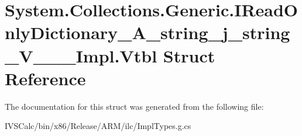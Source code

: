\hypertarget{struct_system_1_1_collections_1_1_generic_1_1_i_read_only_dictionary___a__string__j__string___v_______impl_1_1_vtbl}{}\section{System.\+Collections.\+Generic.\+I\+Read\+Only\+Dictionary\+\_\+\+A\+\_\+string\+\_\+j\+\_\+string\+\_\+\+V\+\_\+\+\_\+\+\_\+\+Impl.\+Vtbl Struct Reference}
\label{struct_system_1_1_collections_1_1_generic_1_1_i_read_only_dictionary___a__string__j__string___v_______impl_1_1_vtbl}


The documentation for this struct was generated from the following file\+:\begin{DoxyCompactItemize}
\item 
I\+V\+S\+Calc/bin/x86/\+Release/\+A\+R\+M/ilc/Impl\+Types.\+g.\+cs\end{DoxyCompactItemize}

